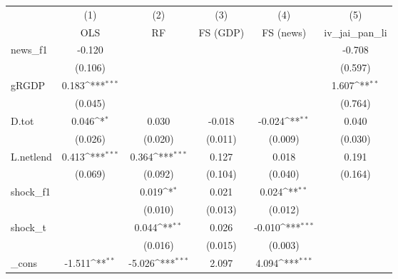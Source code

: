 {
\def\sym#1{\ifmmode^{#1}\else\(^{#1}\)\fi}
\begin{tabular}{l*{5}{c}}
\toprule
            &\multicolumn{1}{c}{(1)}&\multicolumn{1}{c}{(2)}&\multicolumn{1}{c}{(3)}&\multicolumn{1}{c}{(4)}&\multicolumn{1}{c}{(5)}\\
            &\multicolumn{1}{c}{OLS}&\multicolumn{1}{c}{RF}&\multicolumn{1}{c}{FS (GDP)}&\multicolumn{1}{c}{FS (news)}&\multicolumn{1}{c}{iv\_jai\_pan\_li}\\
\midrule
news\_f1     &      -0.120         &                     &                     &                     &      -0.708         \\
            &     (0.106)         &                     &                     &                     &     (0.597)         \\
\addlinespace
gRGDP       &       0.183\sym{***}&                     &                     &                     &       1.607\sym{**} \\
            &     (0.045)         &                     &                     &                     &     (0.764)         \\
\addlinespace
D.tot       &       0.046\sym{*}  &       0.030         &      -0.018         &      -0.024\sym{**} &       0.040         \\
            &     (0.026)         &     (0.020)         &     (0.011)         &     (0.009)         &     (0.030)         \\
\addlinespace
L.netlend   &       0.413\sym{***}&       0.364\sym{***}&       0.127         &       0.018         &       0.191         \\
            &     (0.069)         &     (0.092)         &     (0.104)         &     (0.040)         &     (0.164)         \\
\addlinespace
shock\_f1    &                     &       0.019\sym{*}  &       0.021         &       0.024\sym{**} &                     \\
            &                     &     (0.010)         &     (0.013)         &     (0.012)         &                     \\
\addlinespace
shock\_t     &                     &       0.044\sym{**} &       0.026         &      -0.010\sym{***}&                     \\
            &                     &     (0.016)         &     (0.015)         &     (0.003)         &                     \\
\addlinespace
\_cons      &      -1.511\sym{**} &      -5.026\sym{***}&       2.097         &       4.094\sym{***}&                     \\

\end{tabular}}

